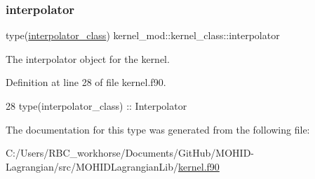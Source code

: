 \subsubsection{\texorpdfstring{interpolator}{interpolator}}
{\footnotesize\ttfamily type(\mbox{\hyperlink{structinterpolator__mod_1_1interpolator__class}{interpolator\+\_\+class}}) kernel\+\_\+mod\+::kernel\+\_\+class\+::interpolator}



The interpolator object for the kernel. 



Definition at line 28 of file kernel.\+f90.


\begin{DoxyCode}
28         \textcolor{keywordtype}{type}(interpolator\_class) :: Interpolator
\end{DoxyCode}


The documentation for this type was generated from the following file\+:\begin{DoxyCompactItemize}
\item 
C\+:/\+Users/\+R\+B\+C\+\_\+workhorse/\+Documents/\+Git\+Hub/\+M\+O\+H\+I\+D-\/\+Lagrangian/src/\+M\+O\+H\+I\+D\+Lagrangian\+Lib/\mbox{\hyperlink{kernel_8f90}{kernel.\+f90}}\end{DoxyCompactItemize}
